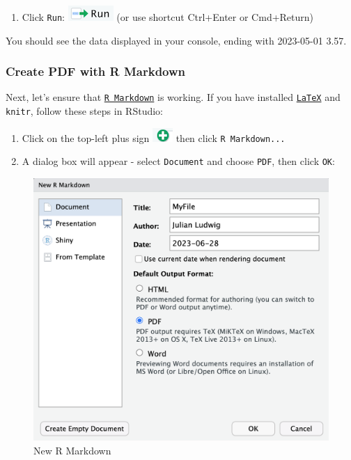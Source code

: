 \documentclass[
]{book}
\providecommand{\tightlist}{%
  \setlength{\itemsep}{0pt}\setlength{\parskip}{0pt}}
\begin{document}
\begin{enumerate}
\def\labelenumi{\arabic{enumi}.}
\setcounter{enumi}{10}
\tightlist
\item
  Click \texttt{Run}: \includegraphics{files/icons-rstudio/run.png} (or use shortcut Ctrl+Enter or Cmd+Return)
\end{enumerate}

You should see the data displayed in your console, ending with 2023-05-01 3.57.

\hypertarget{create-pdf-with-r-markdown}{%
\subsubsection*{Create PDF with R Markdown}\label{create-pdf-with-r-markdown}}

Next, let's ensure that \href{https://rmarkdown.rstudio.com/}{\texttt{R\ Markdown}} is working. If you have installed \href{https://www.latex-project.org/}{\texttt{LaTeX}} and \texttt{knitr}, follow these steps in RStudio:

\begin{enumerate}
\def\labelenumi{\arabic{enumi}.}
\setcounter{enumi}{11}
\tightlist
\item
  Click on the top-left plus sign \includegraphics{files/icons-rstudio/plus.png} then click \texttt{R\ Markdown...}
\item
  A dialog box will appear - select \texttt{Document} and choose \texttt{PDF}, then click \texttt{OK}:
\end{enumerate}

\begin{figure}
\centering
\includegraphics{files/icons-rstudio/openrmarkdown-big.png}
\caption{\label{fig:new-rmarkdown}New R Markdown}
\end{figure}
\end{document}
